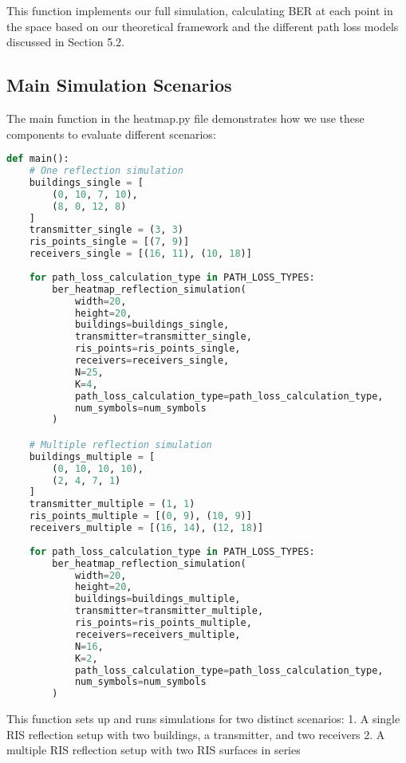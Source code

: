This function implements our full simulation, calculating BER at each point in the space based on our theoretical framework and the different path loss models discussed in Section 5.2.

\subsection{Main Simulation Scenarios}

The main function in the heatmap.py file demonstrates how we use these components to evaluate different scenarios:

\begin{lstlisting}[language=python, caption={Main Simulation Scenarios}]
def main():
    # One reflection simulation
    buildings_single = [
        (0, 10, 7, 10),
        (8, 0, 12, 8)
    ]
    transmitter_single = (3, 3)
    ris_points_single = [(7, 9)]
    receivers_single = [(16, 11), (10, 18)]
    
    for path_loss_calculation_type in PATH_LOSS_TYPES:
        ber_heatmap_reflection_simulation(
            width=20,
            height=20,
            buildings=buildings_single,
            transmitter=transmitter_single,
            ris_points=ris_points_single,
            receivers=receivers_single,
            N=25,
            K=4,
            path_loss_calculation_type=path_loss_calculation_type,
            num_symbols=num_symbols
        )

    # Multiple reflection simulation
    buildings_multiple = [
        (0, 10, 10, 10),
        (2, 4, 7, 1)
    ]
    transmitter_multiple = (1, 1)
    ris_points_multiple = [(0, 9), (10, 9)]
    receivers_multiple = [(16, 14), (12, 18)]
    
    for path_loss_calculation_type in PATH_LOSS_TYPES:
        ber_heatmap_reflection_simulation(
            width=20,
            height=20,
            buildings=buildings_multiple,
            transmitter=transmitter_multiple,
            ris_points=ris_points_multiple,
            receivers=receivers_multiple,
            N=16,
            K=2,
            path_loss_calculation_type=path_loss_calculation_type,
            num_symbols=num_symbols
        )
\end{lstlisting}

This function sets up and runs simulations for two distinct scenarios:
1. A single RIS reflection setup with two buildings, a transmitter, and two receivers
2. A multiple RIS reflection setup with two RIS surfaces in series

